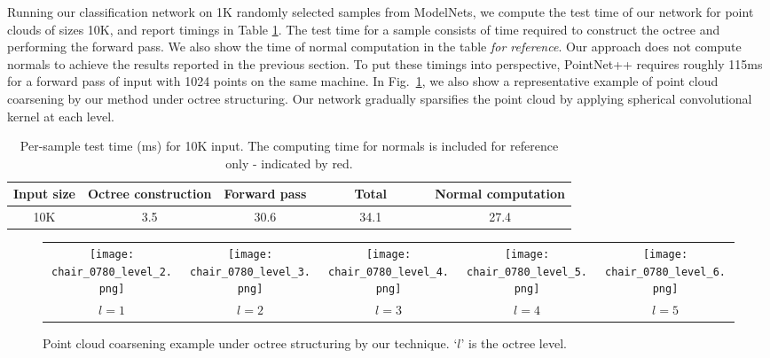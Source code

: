 \documentclass[10pt,twocolumn,letterpaper]{article}
\begin{document}
{Running our classification network on 1K randomly selected samples from ModelNets, we compute the test time of our network for point clouds of sizes 10K, and report timings in Table \ref{tab:test_time}. 
The test time for a sample consists of time required to construct the octree and performing the forward pass. We also show the time of normal computation in the table \textit{for reference}.  Our approach does not compute normals to achieve the results reported in the previous section. To put these timings into perspective,  PointNet++ \cite{qi2017pointnetplusplus} requires roughly 115ms for a forward pass of input with 1024 points on the same machine. In Fig.~\ref{fig:octree_coarsen}, we also show a representative example of point cloud coarsening by our method under octree structuring. Our network gradually sparsifies the point cloud by applying spherical convolutional kernel at each level. \begin{table}
\centering
\begin{adjustbox}{width=0.47\textwidth}
{\LARGE\begin{tabular}{c|c|c|c||c}
  \hline  
 Input size & Octree construction & Forward pass&~~~~~Total~~~~~& \cellcolor{red!15} Normal computation \\
  \hline
  \hline
  10K & 3.5 & 30.6 & 34.1& \cellcolor{red!7}27.4\\
  \hline
\end{tabular}}
\end{adjustbox}
\caption{Per-sample test time (ms) for 10K input. The computing time for normals is included for reference only - indicated by red.}
\label{tab:test_time}
\vspace{-2mm}
\end{table}
\begin{figure}
    \centering
    \begin{tabular}{ccccc}
         \texttt{[image: chair\_0780\_level\_2.png]}&  
         \texttt{[image: chair\_0780\_level\_3.png]}& 
         \texttt{[image: chair\_0780\_level\_4.png]}& 
         \texttt{[image: chair\_0780\_level\_5.png]}& 
         \texttt{[image: chair\_0780\_level\_6.png]}\\
         $l=1$ & $l=2$ & $l=3$ & $l=4$& $l=5$ \\
    \end{tabular}
    \caption{Point cloud coarsening example under octree structuring by our technique. `$l$' is the octree level.}
    \label{fig:octree_coarsen}
    \vspace{-5mm}
\end{figure}
}
\end{document}
